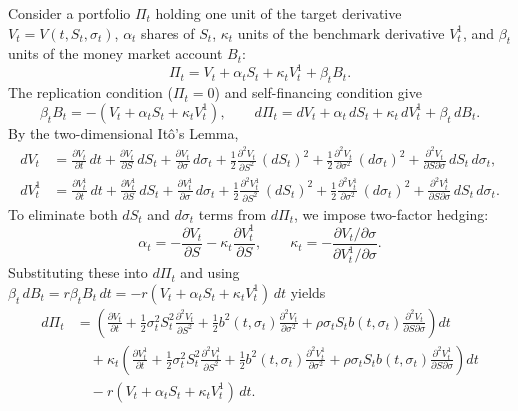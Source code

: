 Consider a portfolio $\Pi_t$ holding one unit of the target derivative $V_t = V(t, S_t, \sigma_t)$, $\alpha_t$ shares of $S_t$, $\kappa_t$ units of the benchmark derivative $V_t^1$, and $\beta_t$ units of the money market account $B_t$:
\[
    \Pi_t = V_t + \alpha_t S_t + \kappa_t V_t^1 + \beta_t B_t.
\]
The replication condition ($\Pi_t = 0$) and self-financing condition give
\[
    \beta_t B_t = -(V_t + \alpha_t S_t + \kappa_t V_t^1), \qquad
    d\Pi_t = dV_t + \alpha_t\,dS_t + \kappa_t\,dV_t^1 + \beta_t\,dB_t.
\]
By the two-dimensional It\^o's Lemma,
\begin{align*}
    dV_t &= \frac{\partial V_t}{\partial t}\,dt + \frac{\partial V_t}{\partial S}\,dS_t + \frac{\partial V_t}{\partial \sigma}\,d\sigma_t
    + \frac{1}{2}\frac{\partial^2 V_t}{\partial S^2}\,(dS_t)^2 + \frac{1}{2}\frac{\partial^2 V_t}{\partial \sigma^2}\,(d\sigma_t)^2 + \frac{\partial^2 V_t}{\partial S \partial \sigma}\,dS_t\,d\sigma_t, \\
    dV_t^1 &= \frac{\partial V_t^1}{\partial t}\,dt + \frac{\partial V_t^1}{\partial S}\,dS_t + \frac{\partial V_t^1}{\partial \sigma}\,d\sigma_t
    + \frac{1}{2}\frac{\partial^2 V_t^1}{\partial S^2}\,(dS_t)^2 + \frac{1}{2}\frac{\partial^2 V_t^1}{\partial \sigma^2}\,(d\sigma_t)^2 + \frac{\partial^2 V_t^1}{\partial S \partial \sigma}\,dS_t\,d\sigma_t.
\end{align*}
To eliminate both $dS_t$ and $d\sigma_t$ terms from $d\Pi_t$, we impose two-factor hedging:
\[
    \alpha_t = -\frac{\partial V_t}{\partial S} - \kappa_t\frac{\partial V_t^1}{\partial S}, \qquad
    \kappa_t = -\frac{\partial V_t / \partial \sigma}{\partial V_t^1 / \partial \sigma}.
\]
Substituting these into $d\Pi_t$ and using $\beta_t\,dB_t = r\beta_t B_t\,dt = -r(V_t + \alpha_t S_t + \kappa_t V_t^1)\,dt$ yields
\begin{align*}
    d\Pi_t
    &= \left(\frac{\partial V_t}{\partial t} + \frac{1}{2}\sigma_t^2 S_t^2 \frac{\partial^2 V_t}{\partial S^2} + \frac{1}{2}b^2(t, \sigma_t)\frac{\partial^2 V_t}{\partial \sigma^2} + \rho\sigma_t S_t b(t, \sigma_t)\frac{\partial^2 V_t}{\partial S \partial \sigma}\right)dt \\
    &\quad + \kappa_t\left(\frac{\partial V_t^1}{\partial t} + \frac{1}{2}\sigma_t^2 S_t^2 \frac{\partial^2 V_t^1}{\partial S^2} + \frac{1}{2}b^2(t, \sigma_t)\frac{\partial^2 V_t^1}{\partial \sigma^2} + \rho\sigma_t S_t b(t, \sigma_t)\frac{\partial^2 V_t^1}{\partial S \partial \sigma}\right)dt \\
    &\quad - r(V_t + \alpha_t S_t + \kappa_t V_t^1)\,dt.
\end{align*}

